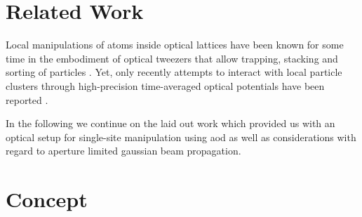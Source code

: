 \section{Related Work}

Local manipulations of atoms inside optical lattices have been known for some
time in the embodiment of optical tweezers that allow trapping, stacking and
sorting of particles \cite{Tadmor2004}. Yet, only recently attempts to
interact with local particle clusters through high-precision time-averaged
optical potentials have been reported \cite{Roy2016}.

In the following we continue on the laid out work \cite{Hertlein2017} which
provided us with an optical setup for single-site manipulation using
\gls{aod} as well as considerations with regard to aperture limited
gaussian beam propagation.

\section{Concept}



